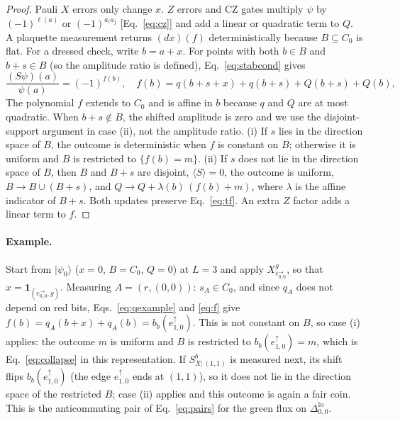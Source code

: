 \documentclass[a4paper]{article}
\newcommand{\rd}{r}
\newcommand{\gr}{g}
\newcommand{\bl}{b}
\providecommand{\ket}[1]{\ensuremath{|#1\rangle}}
\newcommand{\eh}[1]{e^{\rightarrow}_{#1}}   %
\newcommand{\ev}[1]{e^{\uparrow}_{#1}}      %
\newcommand{\tlo}[1]{\Delta^{\mathrm{lo}}_{#1}}
\begin{document}
\begin{proof}
Pauli $X$ errors only change $x$. $Z$ errors and CZ gates multiply $\psi$ by $(-1)^{\ell(a)}$ or $(-1)^{a_ia_j}$ [Eq.~\eqref{eq:cz}] and add a linear or quadratic term to $Q$. A plaquette measurement returns $(dx)(f)$ deterministically because $B\subseteq C_0$ is flat. For a dressed check, write $b=a+x$. For points with both $b\in B$ and $b+s\in B$ (so the amplitude ratio is defined), Eq.~\eqref{eq:stabcond} gives
\begin{equation}
  \frac{(S\psi)(a)}{\psi(a)}=(-1)^{f(b)},\quad f(b)=q(b+s+x)+q(b+s)+Q(b+s)+Q(b),
  \label{eq:f}
\end{equation}
The polynomial $f$ extends to $C_0$ and is affine in $b$ because $q$ and $Q$ are at most quadratic. When $b+s\notin B$, the shifted amplitude is zero and we use the disjoint-support argument in case (ii), not the amplitude ratio. (i) If $s$ lies in the direction space of $B$, the outcome is deterministic when $f$ is constant on $B$; otherwise it is uniform and $B$ is restricted to $\{f(b)=m\}$. (ii) If $s$ does not lie in the direction space of $B$, then $B$ and $B+s$ are disjoint, $\langle S\rangle=0$, the outcome is uniform, $B\to B\cup(B+s)$, and $Q\to Q+\lambda(b)\,(f(b)+m)$, where $\lambda$ is the affine indicator of $B+s$. Both updates preserve Eq.~\eqref{eq:tf}. An extra $Z$ factor adds a linear term to $f$.
\end{proof}

\paragraph{Example.}
Start from $\ket{\psi_0}$ ($x=0$, $B=C_0$, $Q=0$) at $L=3$ and apply $X^\gr_{\eh{0,0}}$, so that $x=\mathbf 1_{(\eh{0,0},\gr)}$. Measuring $A=(\rd,(0,0))$: $s_A\in C_0$, and since $q_A$ does not depend on red bits, Eqs.~\eqref{eq:qexample} and \eqref{eq:f} give $f(b)=q_A(b+x)+q_A(b)=b_\bl(\ev{1,0})$. This is not constant on $B$, so case (i) applies: the outcome $m$ is uniform and $B$ is restricted to $b_\bl(\ev{1,0})=m$, which is Eq.~\eqref{eq:collapse} in this representation. If $S^\bl_{X;(1,1)}$ is measured next, its shift flips $b_\bl(\ev{1,0})$ (the edge $\ev{1,0}$ ends at $(1,1)$), so it does not lie in the direction space of the restricted $B$; case (ii) applies and this outcome is again a fair coin. This is the anticommuting pair of Eq.~\eqref{eq:pairs} for the green flux on $\tlo{0,0}$.
\end{document}
